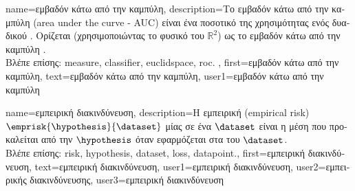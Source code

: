 {name={\foreignlanguage{greek}{εμβαδόν κάτω από την καμπύλη}}, 
	description={\foreignlanguage{greek}{Το εμβαδόν κάτω από την καμπύλη} 
		(area under the curve - AUC) \foreignlanguage{greek}{είναι ένα ποσοτικό}  \foreignlanguage{greek}{της 
		χρησιμότητας ενός δυαδικού}  \cite{Hanley:1982aa}. \foreignlanguage{greek}{Ορίζεται 
		(χρησιμοποιώντας το φυσικό}  \foreignlanguage{greek}{του}  $\mathbb{R}^{2}$) 
		\foreignlanguage{greek}{ως το εμβαδόν κάτω από την καμπύλη} .
		\\
		\foreignlanguage{greek}{Βλέπε επίσης:} \gls{measure}, \gls{classifier}, \gls{euclidspace}, \gls{roc}. } , 
 	first={\foreignlanguage{greek}{εμβαδόν κάτω από την καμπύλη}}, 
 	text={\foreignlanguage{greek}{εμβαδόν κάτω από την καμπύλη}},
	user1={\foreignlanguage{greek}{εμβαδόν κάτω από την καμπύλη}} %
}%

{name={\foreignlanguage{greek}{εμπειρική διακινδύνευση}},
	description={\foreignlanguage{greek}{Η εμπειρική}  
		(empirical risk) $\emprisk{\hypothesis}{\dataset}$ \foreignlanguage{greek}{μίας}  
		\foreignlanguage{greek}{σε ένα}  $\dataset$ \foreignlanguage{greek}{είναι 
		η μέση}  \foreignlanguage{greek}{που προκαλείται από την 
  		$\hypothesis$ όταν εφαρμόζεται στα}  \foreignlanguage{greek}{του} $\dataset$.
		\\
		\foreignlanguage{greek}{Βλέπε επίσης:} \gls{risk}, \gls{hypothesis}, \gls{dataset}, \gls{loss}, \gls{datapoint}.},
	first={\foreignlanguage{greek}{εμπειρική διακινδύνευση}},
	text={\foreignlanguage{greek}{εμπειρική διακινδύνευση}},
	user1={\foreignlanguage{greek}{εμπειρική διακινδύνευση}}, %
	user2={\foreignlanguage{greek}{εμπειρικής διακινδύνευσης}}, %
	user3={\foreignlanguage{greek}{εμπειρική διακινδύνευση}} %
}

